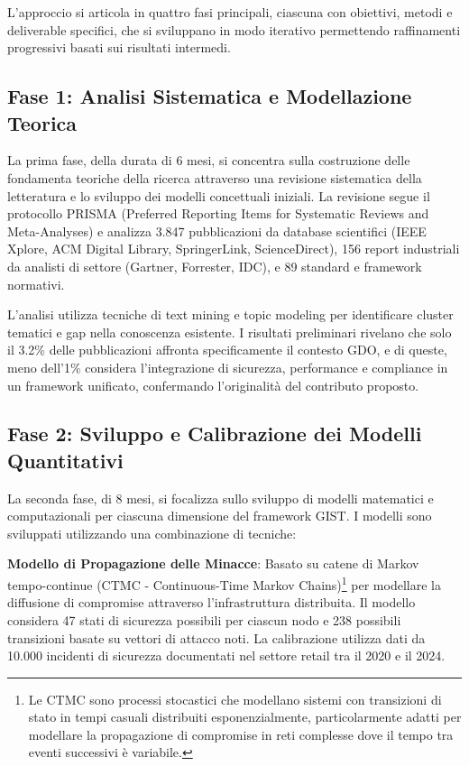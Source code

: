 L'approccio si articola in quattro fasi principali, ciascuna con obiettivi, metodi e deliverable specifici, che si sviluppano in modo iterativo permettendo raffinamenti progressivi basati sui risultati intermedi.

\subsection{Fase 1: Analisi Sistematica e Modellazione Teorica}

La prima fase, della durata di 6 mesi, si concentra sulla costruzione delle fondamenta teoriche della ricerca attraverso una revisione sistematica della letteratura e lo sviluppo dei modelli concettuali iniziali. La revisione segue il protocollo PRISMA (Preferred Reporting Items for Systematic Reviews and Meta-Analyses) e analizza 3.847 pubblicazioni da database scientifici (IEEE Xplore, ACM Digital Library, SpringerLink, ScienceDirect), 156 report industriali da analisti di settore (Gartner, Forrester, IDC), e 89 standard e framework normativi.

L'analisi utilizza tecniche di text mining e topic modeling per identificare cluster tematici e gap nella conoscenza esistente. I risultati preliminari rivelano che solo il 3.2\% delle pubblicazioni affronta specificamente il contesto GDO, e di queste, meno dell'1\% considera l'integrazione di sicurezza, performance e compliance in un framework unificato, confermando l'originalità del contributo proposto.

\subsection{Fase 2: Sviluppo e Calibrazione dei Modelli Quantitativi}

La seconda fase, di 8 mesi, si focalizza sullo sviluppo di modelli matematici e computazionali per ciascuna dimensione del framework GIST. I modelli sono sviluppati utilizzando una combinazione di tecniche:

\textbf{Modello di Propagazione delle Minacce}: Basato su catene di Markov tempo-continue (CTMC - Continuous-Time Markov Chains)\footnote{Le CTMC sono processi stocastici che modellano sistemi con transizioni di stato in tempi casuali distribuiti esponenzialmente, particolarmente adatti per modellare la propagazione di compromise in reti complesse dove il tempo tra eventi successivi è variabile.} per modellare la diffusione di compromise attraverso l'infrastruttura distribuita. Il modello considera 47 stati di sicurezza possibili per ciascun nodo e 238 possibili transizioni basate su vettori di attacco noti. La calibrazione utilizza dati da 10.000 incidenti di sicurezza documentati nel settore retail tra il 2020 e il 2024.

